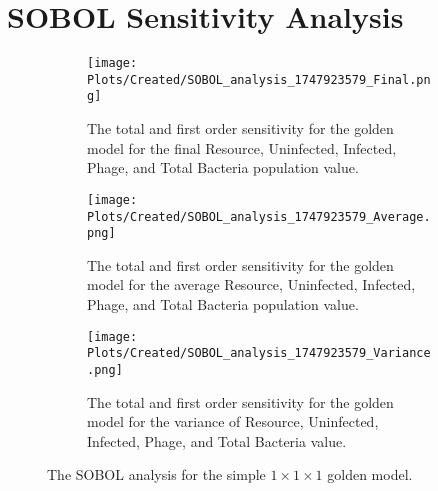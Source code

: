 \section{SOBOL Sensitivity Analysis}
\begin{figure}[h!]
    \centering
    \begin{subfigure}{0.49\linewidth}
        \centering
        \texttt{[image: Plots/Created/SOBOL\_analysis\_1747923579\_Final.png]}
        \caption{
            The total and first order sensitivity for the golden model for the final Resource, Uninfected, Infected, Phage, and Total Bacteria population value. 
        }
        \label{fig:created:SOBOL_final}
    \end{subfigure}
    \hfill
    \begin{subfigure}{0.49\linewidth}
        \centering
        \texttt{[image: Plots/Created/SOBOL\_analysis\_1747923579\_Average.png]}
        \caption{
            The total and first order sensitivity for the golden model for the average Resource, Uninfected, Infected, Phage, and Total Bacteria population value. 
        }
        \label{fig:created:SOBOL_average}
    \end{subfigure}
    \hfill
    \begin{subfigure}{0.49\linewidth}
        \centering
        \texttt{[image: Plots/Created/SOBOL\_analysis\_1747923579\_Variance.png]}
        \caption{
            The total and first order sensitivity for the golden model for the variance of Resource, Uninfected, Infected, Phage, and Total Bacteria value. 
        }
        \label{fig:created:SOBOL_variance}
    \end{subfigure}
    \caption{The SOBOL analysis for the simple $1\times 1 \times 1$ golden model. }
\end{figure}
